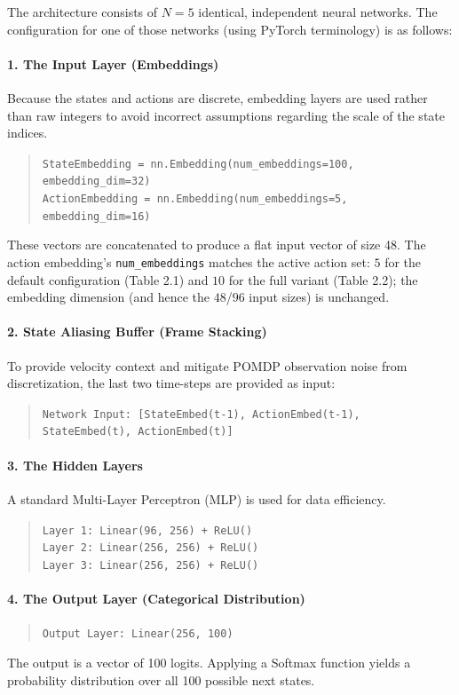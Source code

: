 \documentclass[11pt]{article}
\begin{document}
The architecture consists of $N = 5$ identical, independent neural networks. The configuration for one of those networks (using PyTorch terminology) is as follows:

\paragraph{1. The Input Layer (Embeddings)}
Because the states and actions are discrete, embedding layers are used rather than raw integers to avoid incorrect assumptions regarding the scale of the state indices.
\begin{quote}
    \texttt{StateEmbedding = nn.Embedding(num\_embeddings=100, embedding\_dim=32)}\\
    \texttt{ActionEmbedding = nn.Embedding(num\_embeddings=5, embedding\_dim=16)}
\end{quote}
These vectors are concatenated to produce a flat input vector of size 48. The action embedding's \texttt{num\_embeddings} matches the active action set: $5$ for the default configuration (Table 2.1) and $10$ for the full variant (Table 2.2); the embedding dimension (and hence the $48$/$96$ input sizes) is unchanged.

\paragraph{2. State Aliasing Buffer (Frame Stacking)}
To provide velocity context and mitigate POMDP observation noise from discretization, the last two time-steps are provided as input:
\begin{quote}
    \texttt{Network Input: [StateEmbed(t-1), ActionEmbed(t-1), StateEmbed(t), ActionEmbed(t)]}
\end{quote}

\paragraph{3. The Hidden Layers}
A standard Multi-Layer Perceptron (MLP) is used for data efficiency.
\begin{quote}
    \texttt{Layer 1: Linear(96, 256) + ReLU()}\\
    \texttt{Layer 2: Linear(256, 256) + ReLU()}\\
    \texttt{Layer 3: Linear(256, 256) + ReLU()}
\end{quote}

\paragraph{4. The Output Layer (Categorical Distribution)}
\begin{quote}
    \texttt{Output Layer: Linear(256, 100)}
\end{quote}
The output is a vector of 100 logits. Applying a Softmax function yields a probability distribution over all 100 possible next states.
\end{document}
